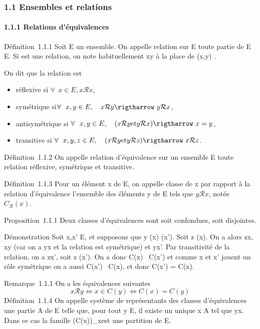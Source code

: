 

\subsubsection{1.1 Ensembles et relations}

\paragraph{1.1.1 Relations d'équivalences}

Définition~1.1.1 Soit E un ensemble. On appelle relation sur E toute
partie de E \times E. Si  est une relation, on note habituellement xy à la
place de (x,y) \in{}.

On dit que la relation est

\begin{itemize}
\itemsep1pt\parskip0pt
\item
  réflexive si $\forall~~x \in E, x\mathcal{R}x$,
\item
  symétrique si$ \forall~~x,y \in E,\quad
  x\mathcal{R}y \rigtharrow~ y\mathcal{R}x$,
\item
  antisymétrique si $\forall~~x,y \in
  E,\quad (x\mathcal{R}y\text{et} y\mathcal{R}x) \rigtharrow~ x = y$,
\item
  transitive si $\forall~~x,y,z \in
  E,\quad (x\mathcal{R}y\text{et} y\mathcal{R}z) \rigtharrow~ x\mathcal{R}z$.
\end{itemize}

Définition~1.1.2 On appelle relation d'équivalence sur un ensemble E
toute relation réflexive, symétrique et transitive.

Définition~1.1.3 Pour un élément x de E, on appelle classe de x par
rapport à la relation d'équivalence  l'ensemble des éléments y de E
tels que $y\mathcal{R}x$, notée $C_{\mathcal{R}}(x)$.

Proposition~1.1.1 Deux classes d'équivalences sont soit confondues, soit
disjointes.

Démonstration Soit x,x' \in E, et supposons que y \inC(x) \bigcapC(x'). Soit z
\inC(x). On a alors zx, xy (car on a yx et la relation est symétrique)
et yx'. Par transitivité de la relation, on a zx', soit z \inC(x'). On a
donc C(x) \subset~C(x') et comme x et x' jouent un rôle symétrique on a aussi
C(x') \subset~C(x), et donc C(x') = C(x).

Remarque~1.1.1 On a les équivalences suivantes
\[
x \mathcal{R} y \Leftrightarrow x \in C(y) \mathrel\Leftrightarrow
C(x) = C(y)
\]
Définition~1.1.4 On appelle système de représentants des classes
d'équivalences une partie A de E telle que, pour tout y \in E, il existe
un unique x \in A tel que yx. Dans ce cas la famille
\left (C(x)\right )_x\inA est une
partition de E.

